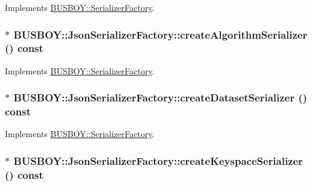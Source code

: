 Implements \hyperlink{classBUSBOY_1_1SerializerFactory_a3df659bd0484f2dc289b936df8dfa5a8}{BUSBOY::SerializerFactory}.\hypertarget{classBUSBOY_1_1JsonSerializerFactory_a575cec17e9b4dffa5eba3f7747414d89}{
\subsubsection[{createAlgorithmSerializer}]{ $\ast$ BUSBOY::JsonSerializerFactory::createAlgorithmSerializer () const}}
\label{classBUSBOY_1_1JsonSerializerFactory_a575cec17e9b4dffa5eba3f7747414d89}


Implements \hyperlink{classBUSBOY_1_1SerializerFactory_abe18c71b6f595c80c435c5682a0e950f}{BUSBOY::SerializerFactory}.\hypertarget{classBUSBOY_1_1JsonSerializerFactory_a59e34529797620296dcbb69352bdd2ca}{
\subsubsection[{createDatasetSerializer}]{ $\ast$ BUSBOY::JsonSerializerFactory::createDatasetSerializer () const}}
\label{classBUSBOY_1_1JsonSerializerFactory_a59e34529797620296dcbb69352bdd2ca}


Implements \hyperlink{classBUSBOY_1_1SerializerFactory_ae8e6bceb0e8e3a3b7f72dca8930376fb}{BUSBOY::SerializerFactory}.\hypertarget{classBUSBOY_1_1JsonSerializerFactory_a1bab634e3e3e407b413f875579b8b16c}{
\subsubsection[{createKeyspaceSerializer}]{ $\ast$ BUSBOY::JsonSerializerFactory::createKeyspaceSerializer () const}}
\label{classBUSBOY_1_1JsonSerializerFactory_a1bab634e3e3e407b413f875579b8b16c}


